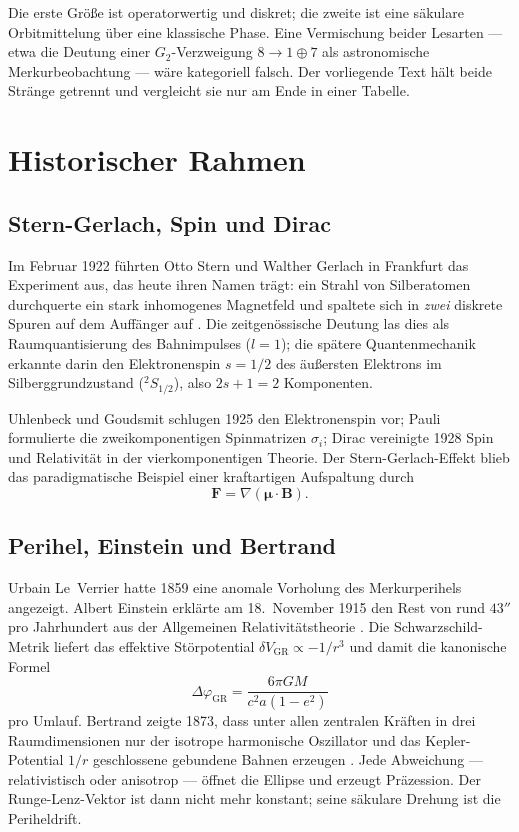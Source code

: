 \documentclass[11pt,a4paper]{article}
\theoremstyle{definition}
\theoremstyle{remark}
\begin{document}
Die erste Größe ist operatorwertig und diskret; die zweite ist eine säkulare Orbitmittelung
über eine klassische Phase. Eine Vermischung beider Lesarten --- etwa die Deutung einer
\(G_2\)-Verzweigung \(8\to 1\oplus 7\) als astronomische Merkurbeobachtung --- wäre
kategoriell falsch. Der vorliegende Text hält beide Stränge getrennt und vergleicht sie
nur am Ende in einer Tabelle.

\section{Historischer Rahmen}

\subsection{Stern-Gerlach, Spin und Dirac}

Im Februar 1922 führten Otto Stern und Walther Gerlach in Frankfurt das Experiment aus, das
heute ihren Namen trägt: ein Strahl von Silberatomen durchquerte ein stark inhomogenes
Magnetfeld und spaltete sich in \emph{zwei} diskrete Spuren auf dem Auffänger auf
\cite{SternGerlach1922}. Die zeitgenössische Deutung las dies als Raumquantisierung des
Bahnimpulses (\(l=1\)); die spätere Quantenmechanik erkannte darin den Elektronenspin
\(s=1/2\) des äußersten Elektrons im Silberggrundzustand (\(^2S_{1/2}\)), also \(2s+1=2\)
Komponenten.

Uhlenbeck und Goudsmit schlugen 1925 den Elektronenspin vor; Pauli formulierte die
zweikomponentigen Spinmatrizen \(\sigma_i\); Dirac vereinigte 1928 Spin und Relativität in
der vierkomponentigen Theorie. Der Stern-Gerlach-Effekt blieb das paradigmatische Beispiel
einer kraftartigen Aufspaltung durch
\begin{equation}
  \mathbf{F}=\nabla(\boldsymbol{\mu}\cdot\mathbf{B}).
\end{equation}

\subsection{Perihel, Einstein und Bertrand}

Urbain Le~Verrier hatte 1859 eine anomale Vorholung des Merkurperihels angezeigt. Albert
Einstein erklärte am 18.~November 1915 den Rest von rund \(43''\) pro Jahrhundert aus der
Allgemeinen Relativitätstheorie \cite{Einstein1915}. Die Schwarzschild-Metrik liefert das
effektive Störpotential \(\delta V_{\mathrm{GR}}\propto -1/r^3\) und damit die kanonische
Formel
\begin{equation}
  \Delta\varphi_{\mathrm{GR}}=\frac{6\pi GM}{c^2 a(1-e^2)}
  \label{eq:einstein}
\end{equation}
pro Umlauf. Bertrand zeigte 1873, dass unter allen zentralen Kräften in drei Raumdimensionen
nur der isotrope harmonische Oszillator und das Kepler-Potential \(1/r\) geschlossene
gebundene Bahnen erzeugen \cite{Bertrand1873}. Jede Abweichung --- relativistisch oder
anisotrop --- öffnet die Ellipse und erzeugt Präzession. Der Runge-Lenz-Vektor ist dann
nicht mehr konstant; seine säkulare Drehung ist die Periheldrift.
\end{document}
